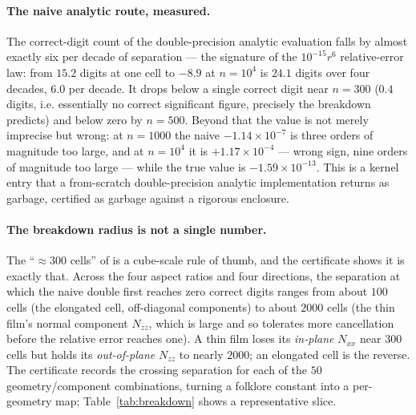 \documentclass[11pt]{amsart}
\theoremstyle{plain}
\theoremstyle{definition}
\theoremstyle{remark}
\begin{document}
\paragraph{The naive analytic route, measured.}
The correct-digit count of the double-precision analytic evaluation falls by
almost exactly six per decade of separation --- the signature of the
$10^{-15}r^{6}$ relative-error law: from $15.2$ digits at one cell to $-8.9$ at
$n=10^{4}$ is $24.1$ digits over four decades, $6.0$ per decade. It drops below
a single correct digit near $n=300$ ($0.4$ digits, i.e. essentially no correct
significant figure, precisely the breakdown \cite{CF2015} predicts) and below
zero by $n=500$. Beyond that the value is not merely imprecise but wrong: at
$n=1000$ the naive $-1.14\times10^{-7}$ is three orders of magnitude too large,
and at $n=10^{4}$ it is $+1.17\times10^{-4}$ --- wrong sign, nine orders of
magnitude too large --- while the true value is $-1.59\times10^{-13}$. This is a
kernel entry that a from-scratch double-precision analytic implementation returns
as garbage, certified as garbage against a rigorous enclosure.

\paragraph{The breakdown radius is not a single number.}
The ``$\approx 300$ cells'' of \cite{CF2015} is a cube-scale rule of thumb, and
the certificate shows it is exactly that. Across the four aspect ratios and four
directions, the separation at which the naive double first reaches zero correct
digits ranges from about $100$ cells (the elongated cell, off-diagonal
components) to about $2000$ cells (the thin film's normal component $N_{zz}$,
which is large and so tolerates more cancellation before the relative error
reaches one). A thin film loses its \emph{in-plane} $N_{xx}$ near $300$ cells but
holds its \emph{out-of-plane} $N_{zz}$ to nearly $2000$; an elongated cell is the
reverse. The certificate records the crossing separation for each of the $50$
geometry/component combinations, turning a folklore constant into a per-geometry
map; Table~\ref{tab:breakdown} shows a representative slice.
\end{document}

